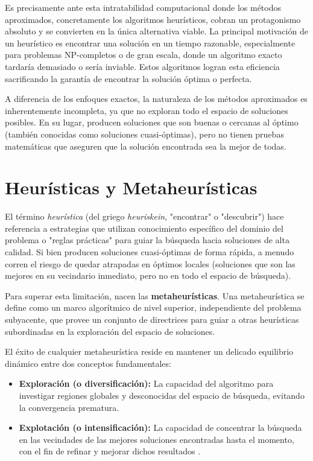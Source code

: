 \documentclass[12pt,a4paper,twoside,openright]{book}
\begin{document}
    Es precisamente ante esta intratabilidad computacional donde los métodos aproximados, concretamente los algoritmos heurísticos, cobran un protagonismo absoluto y se convierten en la única alternativa viable. La principal motivación de un heurístico es encontrar una solución en un tiempo razonable, especialmente para problemas NP-completos o de gran escala, donde un algoritmo exacto tardaría demasiado o sería inviable. Estos algoritmos logran esta eficiencia sacrificando la garantía de encontrar la solución óptima o perfecta.

    A diferencia de los enfoques exactos, la naturaleza de los métodos aproximados es inherentemente incompleta, ya que no exploran todo el espacio de soluciones posibles. En su lugar, producen soluciones que son buenas o cercanas al óptimo (también conocidas como soluciones cuasi-óptimas), pero no tienen pruebas matemáticas que aseguren que la solución encontrada sea la mejor de todas. 

\section{Heurísticas y Metaheurísticas}

    El término \textit{heurística} (del griego \textit{heuriskein}, "encontrar" o "descubrir") hace referencia a estrategias que utilizan conocimiento específico del dominio del problema o "reglas prácticas" para guiar la búsqueda hacia soluciones de alta calidad. Si bien producen soluciones cuasi-óptimas de forma rápida, a menudo corren el riesgo de quedar atrapadas en óptimos locales (soluciones que son las mejores en su vecindario inmediato, pero no en todo el espacio de búsqueda).

    Para superar esta limitación, nacen las \textbf{metaheurísticas}. Una metaheurística se define como un marco algorítmico de nivel superior, independiente del problema subyacente, que provee un conjunto de directrices para guiar a otras heurísticas subordinadas en la exploración del espacio de soluciones. 

    El éxito de cualquier metaheurística reside en mantener un delicado equilibrio dinámico entre dos conceptos fundamentales:
    \begin{itemize}
      \item \textbf{Exploración (o diversificación):} La capacidad del algoritmo para investigar regiones globales y desconocidas del espacio de búsqueda, evitando la convergencia prematura.
       \item \textbf{Explotación (o intensificación):} La capacidad de concentrar la búsqueda en las vecindades de las mejores soluciones encontradas hasta el momento, con el fin de refinar y mejorar dichos resultados \cite{blum2003metaheuristics}.
    \end{itemize}
\end{document}
